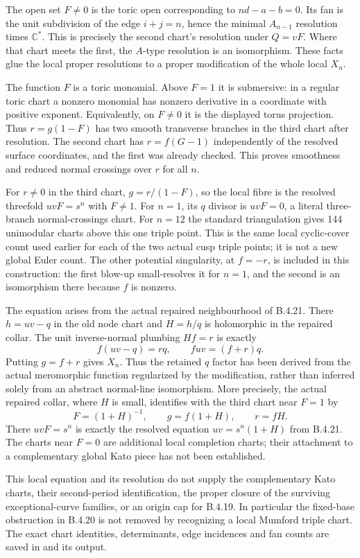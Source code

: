 The open set $F\ne0$ is the toric open corresponding
to $nd-a-b=0$. Its fan is the unit subdivision of
the edge $i+j=n$, hence the minimal $A_{n-1}$
resolution times $\mathbb C^*$. This is precisely
the second chart's resolution under $Q=vF$.
Where that chart meets the first, the $A$-type
resolution is an isomorphism. These facts glue
the local proper resolutions to a proper
modification of the whole local $X_n$.

The function $F$ is a toric monomial. Above $F=1$
it is submersive: in a regular toric chart a
nonzero monomial has nonzero derivative in a
coordinate with positive exponent. Equivalently,
on $F\ne0$ it is the displayed torus projection.
Thus $r=g(1-F)$ has two smooth transverse
branches in the third chart after resolution.
The second chart has $r=f(G-1)$ independently
of the resolved surface coordinates, and the
first was already checked. This proves smoothness
and reduced normal crossings over $r$ for all $n$.

For $r\ne0$ in the third chart,
$g=r/(1-F)$, so the local fibre is the resolved
threefold $uvF=s^n$ with $F\ne1$.
For $n=1$, its $q$ divisor is $uvF=0$, a literal
three-branch normal-crossings chart. For $n=12$
the standard triangulation gives 144 unimodular
charts above this one triple point. This is the
same local cyclic-cover count used earlier for
each of the two actual cusp triple points; it
is not a new global Euler count. The other
potential singularity, at $f=-r$, is included
in this construction: the first blow-up small-resolves it
for $n=1$, and the second is an isomorphism there
because $f$ is nonzero.

The equation arises from the actual repaired
neighbourhood of B.4.21. There $h=uv-q$ in the
old node chart and $H=h/q$ is holomorphic in the
repaired collar. The unit inverse-normal plumbing
$Hf=r$ is exactly
\[
 f(uv-q)=rq,
 \qquad fuv=(f+r)q.
\]
Putting $g=f+r$ gives $X_n$. Thus the retained
$q$ factor has been derived from the actual
meromorphic function regularized by the
modification, rather than inferred solely from
an abstract normal-line isomorphism.
More precisely, the actual repaired collar, where $H$ is small,
identifies with the third chart near $F=1$ by
\[
 F=(1+H)^{-1},\qquad g=f(1+H),\qquad r=fH.
\]
There $uvF=s^n$ is exactly the resolved equation
$uv=s^n(1+H)$ from B.4.21. The charts near $F=0$
are additional local completion charts; their attachment
to a complementary global Kato piece has not been established.

This local equation and its resolution do not
supply the complementary Kato charts, their
second-period identification, the proper closure
of the surviving exceptional-curve families, or
an origin cap for B.4.19. In particular the
fixed-base obstruction in B.4.20 is not removed
by recognizing a local Mumford triple chart.
The exact chart identities, determinants, edge
incidences and fan counts are saved in
 and its
output.

